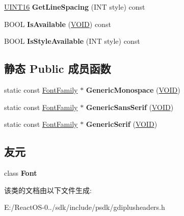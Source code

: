 \begin{DoxyCompactItemize}
\item 
\mbox{\label{class_font_family_ac1b5f7657b112512d7f41385d4c8998d}} 
\hyperlink{_processor_bind_8h_a09f1a1fb2293e33483cc8d44aefb1eb1}{U\+I\+N\+T16} {\bfseries Get\+Line\+Spacing} (I\+NT style) const
\item 
\mbox{\label{class_font_family_ae9298852fca4796927fdfeb8b987eb26}} 
B\+O\+OL {\bfseries Is\+Available} (\hyperlink{interfacevoid}{V\+O\+ID}) const
\item 
\mbox{\label{class_font_family_a7f24f2f71117ae1cd2261720fd3a6048}} 
B\+O\+OL {\bfseries Is\+Style\+Available} (I\+NT style) const
\end{DoxyCompactItemize}
\subsection*{静态 Public 成员函数}
\begin{DoxyCompactItemize}
\item 
\mbox{\label{class_font_family_a917f2c43c41d38109217995731671986}} 
static const \hyperlink{class_font_family}{Font\+Family} $\ast$ {\bfseries Generic\+Monospace} (\hyperlink{interfacevoid}{V\+O\+ID})
\item 
\mbox{\label{class_font_family_a310b09baba8a4e5e4b583f2dd269b1d4}} 
static const \hyperlink{class_font_family}{Font\+Family} $\ast$ {\bfseries Generic\+Sans\+Serif} (\hyperlink{interfacevoid}{V\+O\+ID})
\item 
\mbox{\label{class_font_family_a4bca5c9f63c6960a7a8399b6a7818a69}} 
static const \hyperlink{class_font_family}{Font\+Family} $\ast$ {\bfseries Generic\+Serif} (\hyperlink{interfacevoid}{V\+O\+ID})
\end{DoxyCompactItemize}
\subsection*{友元}
\begin{DoxyCompactItemize}
\item 
\mbox{\label{class_font_family_ad564b94b59dc295de3dfc4415d95cca8}} 
class {\bfseries Font}
\end{DoxyCompactItemize}


该类的文档由以下文件生成\+:\begin{DoxyCompactItemize}
\item 
E\+:/\+React\+O\+S-\/0../sdk/include/psdk/gdiplusheaders.\+h\end{DoxyCompactItemize}
